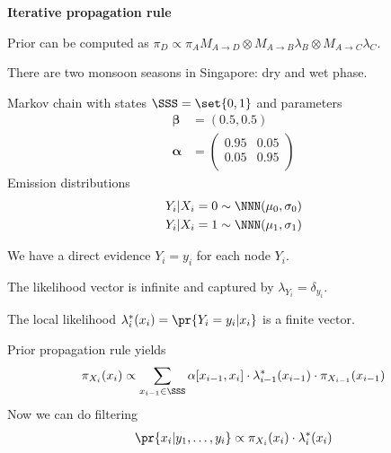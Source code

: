 \documentclass[landscape,footrule]{foils}
\renewcommand{\vec}[1]{\boldsymbol{#1}}
\begin{document}
\textbf{Iterative propagation rule}
\begin{triangles}
\item Prior can be computed as $\pi_D\propto \pi_AM_{A\to D} \otimes M_{A\to B}\lambda_B\otimes M_{A\to C}\lambda_C$\enspace.
\end{triangles}



There are two monsoon seasons in Singapore: dry and wet phase.

\enlargethispage{1cm}
Markov chain with states $\SSS=\set{0,1}$ and parameters
\begin{align*}
\vec{\beta}&=(0.5, 0.5)\\
\vec{\alpha}&=
\begin{pmatrix}
0.95 & 0.05\\
0.05 & 0.95\\
\end{pmatrix}
\end{align*}
Emission distributions
\begin{align*}
Y_i|X_i=0\sim\NNN(\mu_0,\sigma_0)\\
Y_i|X_i=1\sim\NNN(\mu_1,\sigma_1)\\
\end{align*}


\begin{triangles}
\item We have a direct evidence $Y_i=y_i$ for each node $Y_i$. 
\item The likelihood vector is infinite and captured by $\lambda_{Y_i}=\delta_{y_i}$.
\item The local likelihood $\lambda_i^*(x_i)=\pr{Y_i=y_i|x_i}$ is a finite vector. 
\end{triangles}


\enlargethispage{1cm}

\vspace*{-1.0cm}

Prior propagation rule yields
\begin{align*}
\pi_{X_i}(x_i)\propto \sum_{x_{i-1}\in \SSS} \alpha[x_{i-1}, x_i]\cdot\lambda_{i-1}^*(x_{i-1})\cdot \pi_{X_{i-1}}(x_{i-1})
\end{align*}
Now we can do filtering 
\begin{align*}
\pr{x_i|y_1,\ldots,y_{i}}\propto \pi_{X_i}(x_i)\cdot\lambda_i^*(x_i)
\end{align*}
\end{document}
